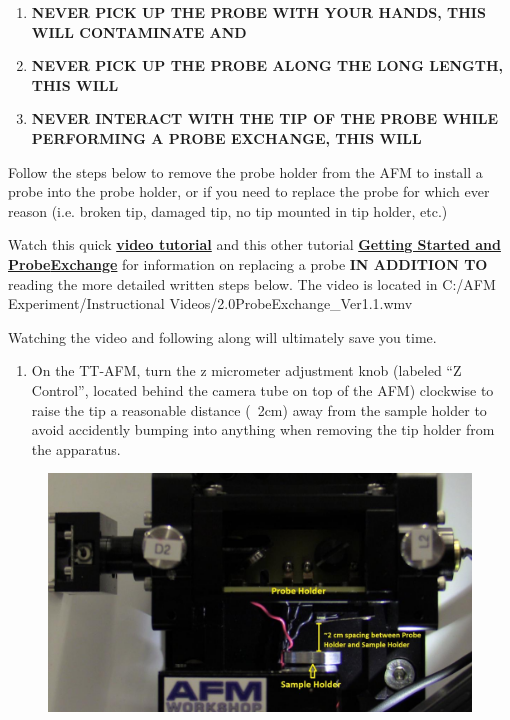 \documentclass{../lab}
\begin{document}
\begin{enumerate}
    \item \textbf{NEVER PICK UP THE PROBE WITH YOUR HANDS, THIS WILL CONTAMINATE AND }

    \item \textbf{NEVER PICK UP THE PROBE ALONG THE LONG LENGTH, THIS WILL }

    \item \textbf{NEVER INTERACT WITH THE TIP OF THE PROBE WHILE PERFORMING A PROBE EXCHANGE, THIS WILL }

\end{enumerate}

Follow the steps below to remove the probe holder from the AFM to install a probe into the probe holder, or if you need to replace the probe for which ever reason (i.e. broken tip, damaged tip, no tip mounted in tip holder, etc.)

Watch this quick \href{http://experimentationlab.berkeley.edu/sites/default/files/AFMImages/2.0ProbeExchange\_Ver1.1.wmv}{\textbf{video tutorial}} and this other tutorial \href{http://experimentationlab.berkeley.edu/sites/default/files/gettingstarted\_final2.mp4}{\textbf{Getting Started and Probe}}\href{http://dev-physicsadv.pantheon.berkeley.edu/sites/default/files/gettingstarted\_final.mp4}{\textbf{Exchange}} for information on replacing a probe \textbf{IN ADDITION TO} reading the more detailed written steps below.  The video is located in C:/AFM Experiment/Instructional Videos/2.0ProbeExchange\_Ver1.1.wmv​

Watching the video and following along will ultimately save you time.

\begin{enumerate}
    \item On the TT-AFM, turn the z micrometer adjustment knob (labeled ``Z Control'', located behind the camera tube on top of the AFM) clockwise to raise the tip a reasonable distance (~2cm) away from the sample holder to avoid accidently bumping into anything when removing the tip holder from the apparatus.

\end{enumerate}

\begin{figure}[h]
    \centering
    \href{http://dev-physicsadv.pantheon.berkeley.edu/sites/default/files/AFMImages/AFMstagespace_0.jpg}{\includegraphics[width=0.5\linewidth]{images/AFMstagespace_0.jpg}}
    \caption{}
    \label{fig:AFMstagespace_0}
\end{figure}
\end{document}
